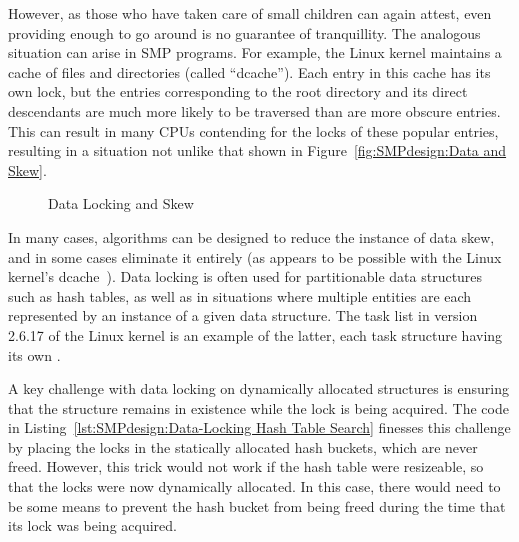 
However, as those who have taken care of small children can again attest,
even providing enough to go around is no guarantee of tranquillity.
The analogous situation can arise in SMP programs.
For example, the Linux kernel maintains a cache of files and directories
(called ``dcache'').
Each entry in this cache has its own lock, but the entries corresponding
to the root directory and its direct descendants are much more likely to
be traversed than are more obscure entries.
This can result in many CPUs contending for the locks of these popular
entries, resulting in a situation not unlike that
shown in Figure~\ref{fig:SMPdesign:Data and Skew}.

\begin{figure}[tbh]
\centering
{}
\caption{Data Locking and Skew}
\end{figure}

In many cases, algorithms can be designed to reduce the instance of
data skew, and in some cases eliminate it entirely
(as appears to be possible with the Linux kernel's dcache~\cite{McKenney04a}).
Data locking is often used for partitionable data structures such as
hash tables, as well as in situations where multiple entities are each
represented by an instance of a given data structure.
The task list in version 2.6.17 of the Linux kernel is an example of the
latter, each task structure having its own .

A key challenge with data locking on dynamically allocated structures
is ensuring that the structure remains in existence while the lock is
being acquired.
The code in
Listing~\ref{lst:SMPdesign:Data-Locking Hash Table Search}
finesses this challenge by placing the locks in the statically allocated
hash buckets, which are never freed.
However, this trick would not work if the hash table were resizeable,
so that the locks were now dynamically allocated.
In this case, there would need to be some means to prevent the hash
bucket from being freed during the time that its lock was being acquired.


